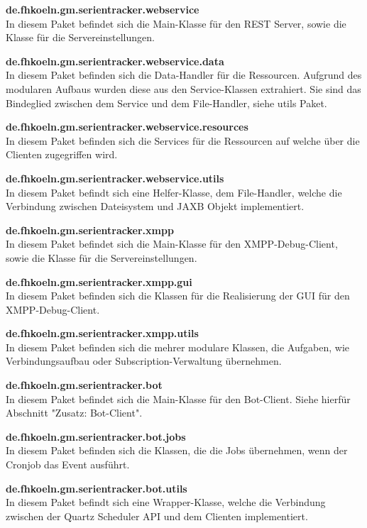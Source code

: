 \textbf{de.fhkoeln.gm.serientracker.webservice}\\
In diesem Paket befindet sich die Main-Klasse für den REST Server, sowie die Klasse für die Servereinstellungen.

\textbf{de.fhkoeln.gm.serientracker.webservice.data}\\
In diesem Paket befinden sich die Data-Handler für die Ressourcen. Aufgrund des modularen Aufbaus wurden diese aus den Service-Klassen extrahiert. Sie sind das Bindeglied zwischen dem Service und dem File-Handler, siehe utils Paket.

\textbf{de.fhkoeln.gm.serientracker.webservice.resources}\\
In diesem Paket befinden sich die Services für die Ressourcen auf welche über die Clienten zugegriffen wird.

\textbf{de.fhkoeln.gm.serientracker.webservice.utils}\\
In diesem Paket befindt sich eine Helfer-Klasse, dem File-Handler, welche die Verbindung zwischen Dateisystem und JAXB Objekt implementiert.

\textbf{de.fhkoeln.gm.serientracker.xmpp}\\
In diesem Paket befindet sich die Main-Klasse für den XMPP-Debug-Client, sowie die Klasse für die Servereinstellungen.

\textbf{de.fhkoeln.gm.serientracker.xmpp.gui}\\
In diesem Paket befinden sich die Klassen für die Realisierung der GUI für den XMPP-Debug-Client.

\textbf{de.fhkoeln.gm.serientracker.xmpp.utils}\\
In diesem Paket befinden sich die mehrer modulare Klassen, die Aufgaben, wie Verbindungsaufbau oder Subscription-Verwaltung übernehmen.

\textbf{de.fhkoeln.gm.serientracker.bot}\\
In diesem Paket befindet sich die Main-Klasse für den Bot-Client. Siehe hierfür Abschnitt "Zusatz: Bot-Client".

\textbf{de.fhkoeln.gm.serientracker.bot.jobs}\\
In diesem Paket befinden sich die Klassen, die die Jobs übernehmen, wenn der Cronjob das Event ausführt.

\textbf{de.fhkoeln.gm.serientracker.bot.utils}\\
In diesem Paket befindt sich eine Wrapper-Klasse, welche die Verbindung zwischen der Quartz Scheduler API und dem Clienten implementiert.

